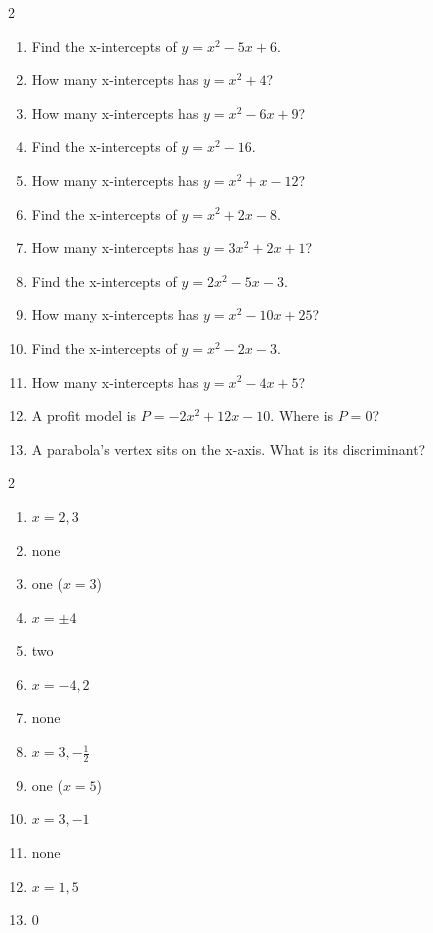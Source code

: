\documentclass[11pt]{article}
\begin{document}
\begin{recapbox}
\begin{multicols}{2}
\small
\begin{enumerate}[leftmargin=*,itemsep=3pt]
  \item Find the x-intercepts of $y=x^2-5x+6$.
  \item How many x-intercepts has $y=x^2+4$?
  \item How many x-intercepts has $y=x^2-6x+9$?
  \item Find the x-intercepts of $y=x^2-16$.
  \item How many x-intercepts has $y=x^2+x-12$?
  \item Find the x-intercepts of $y=x^2+2x-8$.
  \item How many x-intercepts has $y=3x^2+2x+1$?
  \item Find the x-intercepts of $y=2x^2-5x-3$.
  \item How many x-intercepts has $y=x^2-10x+25$?
  \item Find the x-intercepts of $y=x^2-2x-3$.
  \item How many x-intercepts has $y=x^2-4x+5$?
  \item A profit model is $P=-2x^2+12x-10$. Where is $P=0$?
  \item A parabola's vertex sits on the x-axis. What is its discriminant?
\end{enumerate}
\end{multicols}
\end{recapbox}

\begin{keybox}
\begin{multicols}{2}
\small
\begin{enumerate}[leftmargin=*,itemsep=3pt]
  \item $x=2,3$
  \item none
  \item one ($x=3$)
  \item $x=\pm4$
  \item two
  \item $x=-4,2$
  \item none
  \item $x=3,-\tfrac12$
  \item one ($x=5$)
  \item $x=3,-1$
  \item none
  \item $x=1,5$
  \item $0$
\end{enumerate}
\end{multicols}
\end{keybox}
\end{document}
